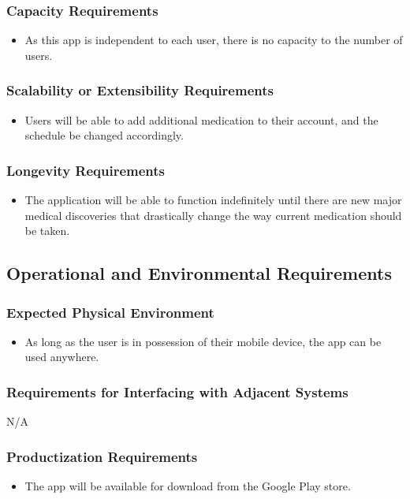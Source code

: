 \documentclass[12pt]{article}
\begin{document}
\subsubsection{Capacity Requirements}
\begin{itemize}
\item As this app is independent to each user, there is no capacity to the number of users.
\end{itemize}

\subsubsection{Scalability or Extensibility Requirements}
\begin{itemize}
\item Users will be able to add additional medication to their account, and the schedule be changed accordingly.
\end{itemize}

\subsubsection{Longevity Requirements}
\begin{itemize}
\item The application will be able to function indefinitely until there are new major medical discoveries that drastically change the way current medication should be taken.
\end{itemize}

\subsection{Operational and Environmental Requirements}

\subsubsection{Expected Physical Environment}
\begin{itemize}
\item As long as the user is in possession of their mobile device, the app can be used anywhere.
\end{itemize}

\subsubsection{Requirements for Interfacing with Adjacent Systems}
N/A

\subsubsection{Productization Requirements}
\begin{itemize}
\item The app will be available for download from the Google Play store.
\end{itemize}
\end{document}
